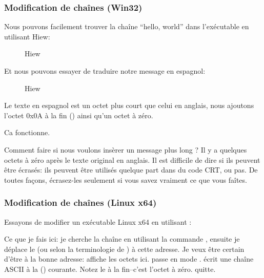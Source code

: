 \subsubsection{Modification de chaînes (Win32)}

Nous pouvons facilement trouver la chaîne ``hello, world'' dans l'exécutable en utilisant Hiew:

\begin{figure}[H]
\centering
{}
\caption{Hiew}
\label{}
\end{figure}

Et nous pouvons essayer de traduire notre message en espagnol:

\begin{figure}[H]
\centering
{}
\caption{Hiew}
\label{}
\end{figure}

Le texte en espagnol est un octet plus court que celui en anglais, nous ajoutons l'octet 0x0A à la fin
 () ainsi qu'un octet à zéro.

Ca fonctionne.

Comment faire si nous voulons insèrer un message plus long ?
Il y a quelques octets à zéro après le texte original en anglais.
Il est difficile de dire si ils peuvent être écrasés: ils peuvent être utilisés quelque part dans du code \ac{CRT},
ou pas.
De toutes façons, écrasez-les seulement si vous savez vraiment ce que vous faîtes.

\subsubsection{Modification de chaînes (Linux x64)}

\myindex{\radare}
Essayons de modifier un exécutable Linux x64 en utilisant \radare{}:



Ce que je fais ici: je cherche la chaîne  en utilisant la commande  \TT{/},
ensuite je déplace le  (ou  selon la terminologie de \radare{}) à cette adresse.
Je veux être certain d'être à la bonne adresse:  affiche les octets ici.
 passe \radare{} en mode .
 écrit une chaîne ASCII à la  () courante.
Notez le  à la fin--c'est l'octet à zéro.
 quitte.

